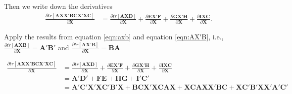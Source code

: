 \documentclass[10pt]{article}
\begin{document}
Then we write down the derivatives
\begin{align*}
\frac{\partial tr[\bm{AX}\bm{X}'\bm{BCX}'\bm{XC}] }{\partial \bm{X} }
&= \frac{\partial tr[\bm{AXD}] }{\partial \bm{X} }
+\frac{\partial \bm{E}\bm{X'}\bm{F} }{\partial \bm{X} }
+\frac{\partial \bm{GX}'\bm{H} }{\partial \bm{X} }
+\frac{\partial \bm{IXC} }{\partial \bm{X} }.
\end{align*}

Apply the results from equation \eqref{eqn:axb} and equation \eqref{eqn:AX'B},
i.e., $ \frac{\partial tr[\bm{AXB}] }{\partial \bm{X} }=\bm{A}'\bm{B}' $ and
$ \frac{\partial tr[\bm{AX}'\bm{B}] }{\partial \bm{X} } = \bm{BA} \label{eqn:AX'B} $

\begin{align*}
\frac{\partial tr[\bm{AX}\bm{X}'\bm{BCX}'\bm{XC}] }{\partial \bm{X} }
&= \frac{\partial tr[\bm{AXD}] }{\partial \bm{X} }
+\frac{\partial \bm{E}\bm{X'}\bm{F} }{\partial \bm{X} }
+\frac{\partial \bm{GX}'\bm{H} }{\partial \bm{X} }
+\frac{\partial \bm{IXC} }{\partial \bm{X} }\\
&= \bm{A}'\bm{D}' + \bm{FE} + \bm{HG} + \bm{I}'\bm{C}'\\
&= \bm{A}'\bm{C}'\bm{X}'\bm{X}\bm{C}'\bm{B}'\bm{X} + \bm{BCX}'\bm{XCAX}
 + \bm{XCAX}\bm{X}'\bm{BC} + \bm{X}\bm{C}'\bm{B}'\bm{X}\bm{X}'\bm{A}'\bm{C}'
\end{align*}



		 


















\end{document}
